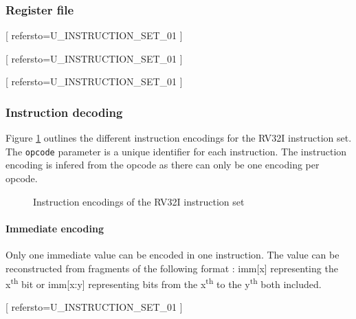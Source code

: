 \subsubsection{Register file}

[
  refersto=U\_INSTRUCTION\_SET\_01
]

[
  refersto=U\_INSTRUCTION\_SET\_01
]

[
  refersto=U\_INSTRUCTION\_SET\_01
]

\subsubsection{Instruction decoding}

\begin{content}
  Figure \ref{fig:instructionencoding} outlines the different instruction encodings for the RV32I instruction set. The \texttt{opcode} parameter is a unique identifier for each instruction. The instruction encoding is infered from the opcode as there can only be one encoding per opcode.
\end{content}

\begin{figure}[h!]
    \centering
    
    \caption{Instruction encodings of the RV32I instruction set}
    \label{fig:instructionencoding}
\end{figure}

\paragraph{Immediate encoding}

\begin{content}
  Only one immediate value can be encoded in one instruction. The value can be reconstructed from fragments of the following format : imm[x] representing the x\textsuperscript{th} bit or imm[x:y] representing bits from the x\textsuperscript{th} to the y\textsuperscript{th} both included.
\end{content}

[
  refersto=U\_INSTRUCTION\_SET\_01
]

